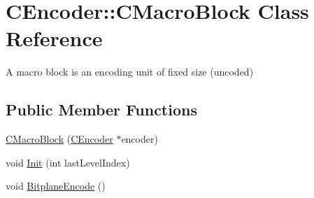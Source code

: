 \hypertarget{classCEncoder_1_1CMacroBlock}{}\section{C\+Encoder\+::C\+Macro\+Block Class Reference}
\label{classCEncoder_1_1CMacroBlock}


A macro block is an encoding unit of fixed size (uncoded)  


\subsection*{Public Member Functions}
\begin{DoxyCompactItemize}
\item 
\mbox{\hyperlink{classCEncoder_1_1CMacroBlock_a70f3cc1cb204a4bcce871bf6b5b134f6}{C\+Macro\+Block}} (\mbox{\hyperlink{classCEncoder}{C\+Encoder}} $\ast$encoder)
\item 
void \mbox{\hyperlink{classCEncoder_1_1CMacroBlock_af3ecc039cc0e3000b394c15265107b38}{Init}} (int last\+Level\+Index)
\item 
void \mbox{\hyperlink{classCEncoder_1_1CMacroBlock_af95842ac15879ab2b3a9b5232bb4f1a5}{Bitplane\+Encode}} ()
\end{DoxyCompactItemize}
